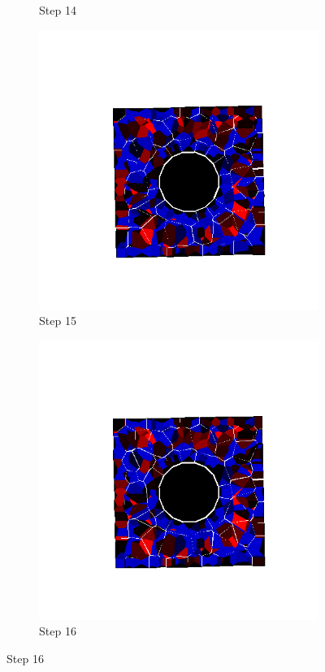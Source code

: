 \begin{figure}[ht!]
\begin{subfigure}{.25\textwidth}
      \caption{Step 14}
      \end{subfigure}%
      \begin{subfigure}{.25\textwidth}
        \centering
        \includegraphics[width=1.0\linewidth]{Files/Small_DEF/IS/DEP5-STEP(015).png}
      \caption{Step 15}
      \end{subfigure}%
      \begin{subfigure}{.25\textwidth}
        \centering
        \includegraphics[width=1.0\linewidth]{Files/Small_DEF/IS/DEP5-STEP(016).png}
      \caption{Step 16}
      \end{subfigure}


\end{figure}
